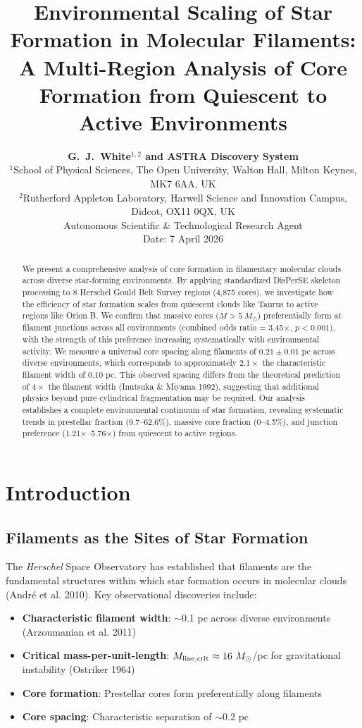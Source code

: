 \documentclass[11pt,a4paper]{article}
\title{\textbf{\Large Environmental Scaling of Star Formation in Molecular Filaments:\\
\large A Multi-Region Analysis of Core Formation from Quiescent to Active Environments}}
\author{\textbf{G.~J.~White$^{1,2}$ and ASTRA Discovery System}\\
\small{$^{1}$School of Physical Sciences, The Open University, Walton Hall, Milton Keynes, MK7 6AA, UK}\\
\small{$^{2}$Rutherford Appleton Laboratory, Harwell Science and Innovation Campus, Didcot, OX11 0QX, UK}\\
\small{Autonomous Scientific \& Technological Research Agent}\\
\small{Date: 7 April 2026}}
\begin{document}
\maketitle

\begin{abstract}
We present a comprehensive analysis of core formation in filamentary molecular clouds across diverse star-forming environments. By applying standardized DisPerSE skeleton processing to 8 Herschel Gould Belt Survey regions (4,875 cores), we investigate how the efficiency of star formation scales from quiescent clouds like Taurus to active regions like Orion B. We confirm that massive cores ($M > 5~M_\odot$) preferentially form at filament junctions across all environments (combined odds ratio = 3.45$\times$, $p < 0.001$), with the strength of this preference increasing systematically with environmental activity. We measure a universal core spacing along filaments of $0.21 \pm 0.01$ pc across diverse environments, which corresponds to approximately $2.1\times$ the characteristic filament width of $0.10$ pc. This observed spacing differs from the theoretical prediction of $4\times$ the filament width (Inutsuka \& Miyama 1992), suggesting that additional physics beyond pure cylindrical fragmentation may be required. Our analysis establishes a complete environmental continuum of star formation, revealing systematic trends in prestellar fraction (9.7--62.6\%), massive core fraction (0--4.5\%), and junction preference (1.21$\times$--5.76$\times$) from quiescent to active regions.
\end{abstract}

\tableofcontents

\section{Introduction}

\subsection{Filaments as the Sites of Star Formation}

The \textit{Herschel} Space Observatory has established that filaments are the fundamental structures within which star formation occurs in molecular clouds (Andr\'e et al. 2010). Key observational discoveries include:

\begin{itemize}
    \item \textbf{Characteristic filament width}: $\sim$0.1 pc across diverse environments (Arzoumanian et al. 2011)
    \item \textbf{Critical mass-per-unit-length}: $M_{\rm line,crit} \approx 16~M_\odot$/pc for gravitational instability (Ostriker 1964)
    \item \textbf{Core formation}: Prestellar cores form preferentially along filaments
    \item \textbf{Core spacing}: Characteristic separation of $\sim$0.2 pc
\end{itemize}
\end{document}
